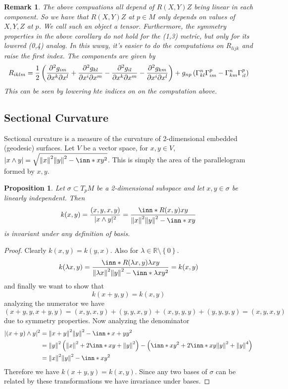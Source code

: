 \documentclass[a4paper]{article}
\newtheorem*{prop}{Proposition}
\newtheorem*{rem}{Remark}
\begin{document}
\begin{rem}
  The above compuations all depend of $R(X,Y)Z$ being linear in each component. So we have that $R(X,Y)Z$ at $p \in M$ only depends on values of $X,Y,Z$ at $p$. We call such an object a tensor. Furthermore, the symmetry properties in the above corollary do not hold for the (1,3) metric, but only for its lowered (0,4) analog. In this wway, it's easier to do the computations on $R_{lijk}$ and raise the first index. The components are given by
  \[
    R_{iklm} = \frac{1}{2} \left( \pdv[2]{g_{im}}{x^k}{x^l} + \pdv[2]{g_{kl}}{x^i}{x^m} - \pdv[2]{g_{il}}{x^k}{x^m} - \pdv[2]{g_{km}}{x^i}{x^l} \right) + g_{np}\left( \Gamma^n_{kl}\Gamma^p_{im} - \Gamma^n_{km}\Gamma^p_{il} \right)
  \]
  This can be seen by lowering hte indices on on the computation above.
\end{rem}

\subsection*{Sectional Curvature}%
Sectional curvature is a measure of the curvature of 2-dimensional embedded (geodesic) surfaces. Let $V$ be a vector space, for $x,y \in V$, $| x \wedge y| = \sqrt{\norm{x}^2\norm{y}^2 - \inn*{x}{y}^2}$. This is simply the area of the parallelogram formed by $x,y$. 

\begin{prop}
  Let $\sigma \subset T_pM$ be a 2-dimensional subspace and let $x,y \in \sigma$ be linearly independent. Then
  \[
    k(x,y) =  \frac{(x,y,x,y)}{|x \wedge y|^2} = \frac{\inn*{R(x,y)x}{y}}{\norm{x}^2\norm{y}^2 - \inn*{x}{y}}
  \]
  is invariant under any definition of basis.
\end{prop}
\begin{proof}
  Clearly $k(x,y) = k(y,x)$. Also for $\lambda \in \mathds{R} \setminus \left\{ 0 \right\}$.
  \[
    k(\lambda x, y) = \frac{\inn*{R(\lambda x, y) \lambda x}{y}}{\norm{\lambda x}^2 \norm{y}^2 - \inn*{\lambda x}{y}^2} = k(x,y)
  \]
  and finally we want to show that
  \[
    k(x + y, y) = k(x,y) 
  \]
  analyzing the numerator we have
  \[
    (x + y, y, x+y, y) = (x,y, x,y) + (y,y,x,y) + (x,y,y,y) + (y,y,y,y) = (x,y,x,y)
  \]
  due to symmetry properties. Now analyzing the denominator
  \[
    \begin{aligned}
      |(x + y) \wedge y|^2 &= \norm{x + y}^2 \norm{y}^2 - \inn*{x+y}{y}^2 \\ 
                           &= \norm{y}^2 \left( \norm{x}^2 + 2 \inn*{x}{y} + \norm{y}^2 \right) - \left( \inn*{x}{y}^2 + 2 \inn*{x}{y} \norm{y}^2 + \norm{y}^4 \right) \\
                           &= \norm{x}^2\norm{y}^2 - \inn*{x}{y}^2
    \end{aligned}
  \]
  Therefore we have $k(x+y,y) = k(x,y)$. Since any two bases of $\sigma$ can be related by these transformations we have invariance under bases.
\end{proof}
\end{document}
